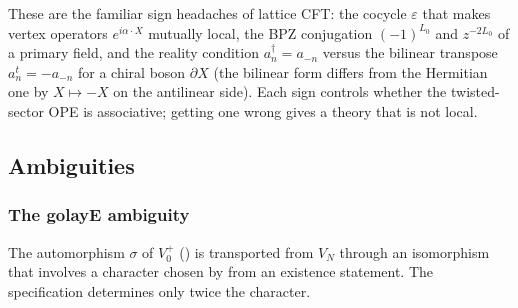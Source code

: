 \begin{physics}
These are the familiar sign headaches of lattice CFT: the cocycle $\varepsilon$ that makes vertex
operators $e^{i\alpha\cdot X}$ mutually local, the BPZ conjugation $(-1)^{L_0}$ and $z^{-2L_0}$ of a
primary field, and the reality condition $a_n^\dagger=a_{-n}$ versus the bilinear transpose
$a_n^t=-a_{-n}$ for a chiral boson $\partial X$ (the bilinear form differs from the Hermitian one by
$X\mapsto -X$ on the antilinear side). Each sign controls whether the twisted-sector OPE is
associative; getting one wrong gives a theory that is not local.
\end{physics}

\subsection{Ambiguities}

\subsubsection{The golayE ambiguity}\label{ch15:sec:golayE}

The automorphism $\sigma$ of $V_0^+$ () is transported from $V_N$ through an
isomorphism that involves a character  chosen by  from an
existence statement. The specification determines only twice the character.

